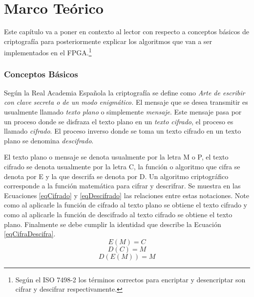 \chapter{Marco Teórico}

Este capítulo va a poner en contexto al lector con respecto a conceptos básicos de criptografía para posteriormente explicar los algoritmos que van a ser implementados en el FPGA.\footnote{Según el ISO 7498-2 los términos correctos para encriptar y desencriptar son cifrar y descifrar respectivamente.}

\subsection{Conceptos Básicos}
Según la Real Academia Española \cite{bruce} la criptografía se define como 
\newline
\newline
\emph{Arte de escribir con clave secreta o de un modo enigmático.}
\newline
\newline
El mensaje que se desea transmitir es usualmente llamado \textit{texto plano} o simplemente \textit{mensaje}. Este mensaje pasa por un proceso donde se disfraza el texto plano en un \textit{texto cifrado}, el proceso es llamado \textit{cifrado}. El proceso inverso donde se toma un texto cifrado en un texto plano se denomina \textit{descifrado}. 

El texto plano o mensaje se denota usualmente por la letra M o P, el texto cifrado se denota usualmente por la letra C, la función o algoritmo que cifra se denota por E y la que descrifa se denota por D. Un algoritmo criptográfico corresponde a la función matemática para cifrar y descrifrar.
\newline
Se muestra en las Ecuaciones \ref{eqCifrado} y \ref{eqDescifrado} las relaciones entre estas notaciones. Note como al aplicarle la función de cifrado al texto plano se obtiene el texto cifrado y como al aplicarle la función de descifrado al texto cifrado se obtiene el texto plano. Finalmente se debe cumplir la identidad que describe la Ecuación \ref{eqCifraDescifra}. \cite{bruce}
\begin{equation} \label{eqCifrado}
E(M) = C
\end{equation}
\begin{equation} \label{eqDescifrado}
D(C) = M
\end{equation}
\begin{equation} \label{eqCifraDescifra}
D(E(M)) = M
\end{equation}


